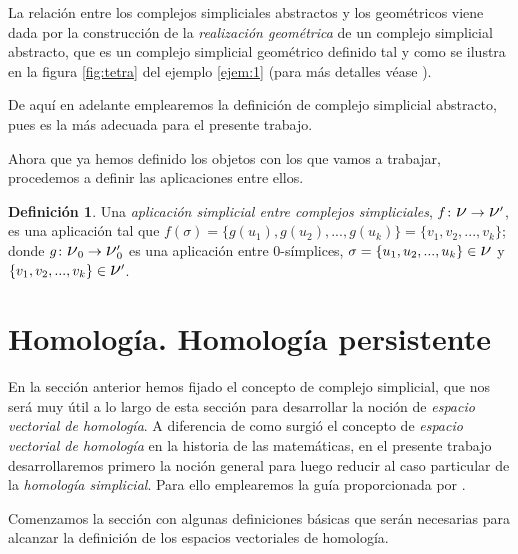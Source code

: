 \documentclass[12pt, a4paper, twoside]{book}
\numberwithin{equation}{section}
\theoremstyle{definition}
\newtheorem{defi}{Definición}[section]
\theoremstyle{remark}
\theoremstyle{plain}
\begin{document}
	La relación entre los complejos simpliciales abstractos y los 
	geométricos viene dada por la construcción de la \emph{realización
	geométrica} de un complejo simplicial abstracto, que es un complejo 
	simplicial geométrico definido tal y como se ilustra en la figura 
	\ref{fig:tetra} del ejemplo \ref{ejem:1} (para más detalles véase 
	\cite{TopoAlg-Edelsbrunner}).

	De aquí en adelante emplearemos la definición de complejo simplicial 
	abstracto, pues es la más adecuada para el presente trabajo.

	Ahora que ya hemos definido los objetos con los que vamos a trabajar, 
	procedemos a definir las aplicaciones entre ellos.
	\begin{defi}
		Una \textit{aplicación simplicial entre complejos 
		simpliciales}, $f\colon\text{{\Large $\nu$}} \rightarrow 
		\text{{\Large $\nu$}$^{\prime}$}$, es una aplicación 
		tal que $f(\sigma)=\{g(u_{1}),g(u_{2}),...,g(u_{k})\}=
		\{v_{1},v_{2},...,v_{k}\}$; donde
		$g\colon\text{{\Large $\nu$}$_{0}$} \rightarrow \text{{\Large 
		$\nu$}$_{0}^{\prime}$}$ es una aplicación entre $0$-símplices,
		$\sigma=\{u_{1},u_{2},...,u_{k}\} \in \text{{\Large $\nu$}}$
		y $\{v_{1},v_{2},...,v_{k}\} \in \text{{\Large $\nu$}$^{
		\prime}$}$.	
	\end{defi}
	
	\section{Homología. Homología persistente}
	
	En la sección anterior hemos fijado el concepto de complejo 
	simplicial, que nos será muy útil a lo largo de esta sección para 
	desarrollar la noción de \emph{espacio vectorial de homología}. A 
	diferencia de como surgió el concepto de \emph{espacio vectorial de
	homología} en la historia de las matemáticas, en el presente trabajo 
	desarrollaremos primero la noción general para luego reducir al caso 
	particular de la \emph{homología simplicial}. Para ello emplearemos la 
	guía proporcionada por \cite{TopoAlg-Edelsbrunner,Homologia-Macho,
	Algebra-Elduque}.

	Comenzamos la sección con algunas definiciones básicas que serán 
	necesarias para alcanzar la definición de los espacios vectoriales de 
	homología.
\end{document}
